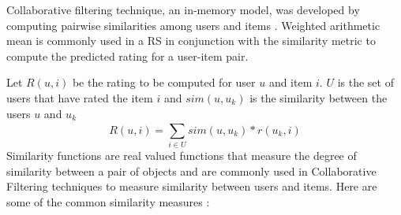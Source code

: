 \documentclass[12pt]{article}
\begin{document}
Collaborative filtering technique, an in-memory model, was developed by computing pairwise similarities among users and items \cite{breese}. Weighted arithmetic mean is commonly used in a RS in conjunction with the similarity metric to compute the predicted rating for a user-item pair. 

Let  $ R(u, i) $ be the rating to be computed for user $ u $ and item $ i $. $ U $ is the set of users that have rated the item $ i $ and $sim(u, u_{k})$ is the similarity between the users $u$ and $u_{k}$ \cite{ricci, sorensen}
\begin{equation}
R(u, i) = {\sum\limits^{}_{i\in{U}} sim(u, u_{k}) * r(u_{k}, i)}
\end{equation}
Similarity functions are real valued functions that measure the degree of similarity between a pair of objects and are commonly used in Collaborative Filtering techniques to measure similarity between users and items. Here are some of the common similarity measures \cite{ricci}:
\end{document}
